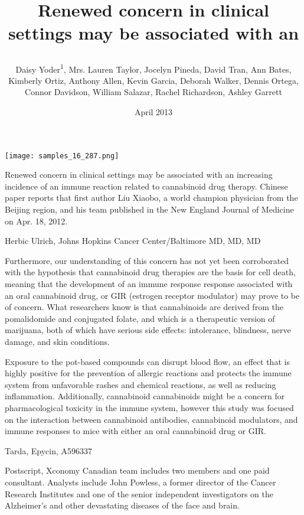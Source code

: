 \documentclass{article}
\title{

Renewed concern in clinical settings may be associated with an}
\author{Daisy Yoder\textsuperscript{1},  Mrs. Lauren Taylor,  Jocelyn Pineda,  David Tran,  Ann Bates,  Kimberly Ortiz,  Anthony Allen,  Kevin Garcia,  Deborah Walker,  Dennis Ortega,  Connor Davidson,  William Salazar,  Rachel Richardson,  Ashley Garrett}
\affil{\textsuperscript{1}University of Cambridge}
\date{April 2013}
\begin{document}
\maketitle

\begin{center}
\begin{minipage}{0.75\linewidth}
\texttt{[image: samples\_16\_287.png]}
\end{minipage}
\end{center}



Renewed concern in clinical settings may be associated with an increasing incidence of an immune reaction related to cannabinoid drug therapy. Chinese paper reports that first author Liu Xiaobo, a world champion physician from the Beijing region, and his team published in the New England Journal of Medicine on Apr. 18, 2012.

Herbic Ulrich, Johns Hopkins Cancer Center/Baltimore MD, MD, MD

Furthermore, our understanding of this concern has not yet been corroborated with the hypothesis that cannabinoid drug therapies are the basis for cell death, meaning that the development of an immune response response associated with an oral cannabinoid drug, or GIR (estrogen receptor modulator) may prove to be of concern. What researchers know is that cannabinoids are derived from the pomalidomide and conjugated folate, and which is a therapeutic version of marijuana, both of which have serious side effects: intolerance, blindness, nerve damage, and skin conditions.

Exposure to the pot-based compounds can disrupt blood flow, an effect that is highly positive for the prevention of allergic reactions and protects the immune system from unfavorable rashes and chemical reactions, as well as reducing inflammation. Additionally, cannabinoid cannabinoids might be a concern for pharmacological toxicity in the immune system, however this study was focused on the interaction between cannabinoid antibodies, cannabinoid modulators, and immune responses to mice with either an oral cannabinoid drug or GIR.

Tarda, Epycin, A596337

Postscript, Xconomy Canadian team includes two members and one paid consultant. Analysts include John Powless, a former director of the Cancer Research Institutes and one of the senior independent investigators on the Alzheimer’s and other devastating diseases of the face and brain.
\end{document}
